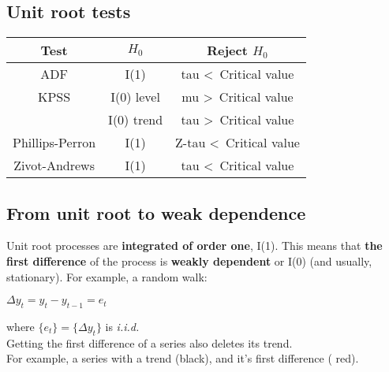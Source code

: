\documentclass[10pt, a4paper, landscape]{article}
\begin{document}
\begin{multicols}{3}
		\subsection*{Unit root tests}
		
		\begin{center}
			\begin{tabular}{ c | c | c }
				Test            & $H_{0}$    & Reject $H_{0}$                     \\ \hline
				ADF             & I(1)       & tau \textless \, Critical value    \\ \hline
				KPSS            & I(0) level & mu \textgreater \, Critical value  \\
				                & I(0) trend & tau \textgreater \, Critical value \\ \hline
				Phillips-Perron & I(1)       & Z-tau \textless \, Critical value  \\ \hline
				Zivot-Andrews   & I(1)       & tau \textless \, Critical value
			\end{tabular}
		\end{center}
		
		\subsection*{From unit root to weak dependence}
		
		Unit root processes are \textbf{integrated of order one}, I(1). This means that \textbf{the first difference} of the process is \textbf{weakly dependent} or I(0) (and usually, stationary). For example, a random walk:
		
		\begin{multicols}{2}
			\begin{center}
				$\Delta y_{t} = y_{t} - y_{t - 1} = e_{t}$
			\end{center}
			
			where $\lbrace e_{t} \rbrace = \lbrace \Delta y_{t} \rbrace$ is \textsl{i.i.d.} \\
			
			Getting the first difference of a series also deletes its trend. \\
			
			For example, a series with a trend (black), and it's first difference ({\color{red} red}).
			
			\columnbreak
			

\end{multicols}
\end{multicols}
\end{document}
